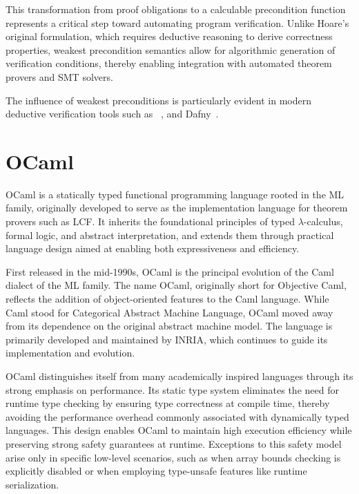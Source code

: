 This transformation from proof obligations to a calculable precondition function represents a critical step toward automating 
program verification. Unlike Hoare's original formulation, which requires deductive reasoning to derive correctness properties, 
weakest precondition semantics allow for algorithmic generation of verification conditions, thereby enabling integration 
with automated theorem provers and SMT solvers.

The influence of weakest preconditions is particularly evident in modern deductive verification tools such as \whythree
~\cite{boogie11why3}, and \textsf{Dafny}~\cite{Leino10}.


\section{OCaml}
\label{sec:OCaml}


OCaml is a statically typed functional programming language rooted in the ML family, originally developed 
to serve as the implementation language for theorem provers such as LCF. It inherits the foundational principles 
of typed $\lambda$-calculus, formal logic, and abstract interpretation, and extends them through practical language design 
aimed at enabling both expressiveness and efficiency.

First released in the mid-1990s, OCaml is the principal evolution of the Caml dialect of the ML family. The name OCaml, 
originally short for Objective Caml, reflects the addition of object-oriented features to the Caml language. While Caml 
stood for Categorical Abstract Machine Language, OCaml moved away from its dependence on the original abstract machine model. 
The language is primarily developed and maintained by INRIA, which continues to guide its implementation and evolution.

OCaml distinguishes itself from many academically inspired languages through its strong emphasis on performance. Its static 
type system eliminates the need for runtime type checking by ensuring type correctness at compile time, thereby avoiding the 
performance overhead commonly associated with dynamically typed languages. This design enables OCaml to maintain high 
execution efficiency while preserving strong safety guarantees at runtime. Exceptions to this safety model arise only in 
specific low-level scenarios, such as when array bounds checking is explicitly disabled or when employing type-unsafe features 
like runtime serialization.

